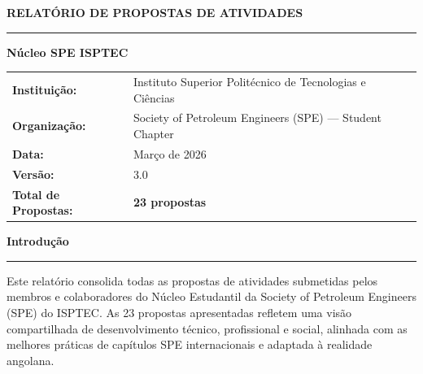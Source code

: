 \documentclass[12pt,a4paper]{article}
\begin{document}
\vspace*{1.5cm}

\begin{center}
{\LARGE\bfseries\color{navy} RELATÓRIO DE PROPOSTAS DE ATIVIDADES}

\vspace{0.4cm}
{\color{gold}\rule{10cm}{1pt}}
\vspace{0.8cm}

{\large\bfseries\color{steelblue} Núcleo SPE ISPTEC}
\end{center}

\vspace{1.2cm}

\begin{mdframed}[
  backgroundcolor=icebg,
  linecolor=steelblue,
  linewidth=1pt,
  innerleftmargin=14pt,
  innerrightmargin=14pt,
  innertopmargin=10pt,
  innerbottommargin=10pt
]
\begin{tabular}{p{4.2cm} p{9cm}}
  {\small\bfseries\color{navy}Instituição:} & {\small Instituto Superior Politécnico de Tecnologias e Ciências} \\[4pt]
  {\small\bfseries\color{navy}Organização:} & {\small Society of Petroleum Engineers (SPE) — Student Chapter} \\[4pt]
  {\small\bfseries\color{navy}Data:} & {\small Março de 2026} \\[4pt]
  {\small\bfseries\color{navy}Versão:} & {\small 3.0} \\[4pt]
  {\small\bfseries\color{navy}Total de Propostas:} & {\small\bfseries\color{steelblue} 23 propostas} \\
\end{tabular}
\end{mdframed}

\vspace{1.0cm}

\begin{center}
{\large\bfseries\color{navy} Introdução}\\[4pt]
{\color{gold}\rule{6cm}{0.8pt}}
\end{center}

\vspace{0.4cm}

Este relatório consolida todas as propostas de atividades submetidas pelos membros e colaboradores do Núcleo Estudantil da Society of Petroleum Engineers (SPE) do ISPTEC. As 23 propostas apresentadas refletem uma visão compartilhada de desenvolvimento técnico, profissional e social, alinhada com as melhores práticas de capítulos SPE internacionais e adaptada à realidade angolana.
\end{document}

